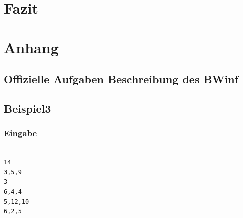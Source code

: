 \documentclass[a4paper,12pt,arial]{scrartcl}
\begin{document}
\section{Fazit}
\section{Anhang}
\subsection{Offizielle Aufgaben Beschreibung des BWinf}
\label{sec:aufgabenstellung}




\subsection{Beispiel3}
\subsubsection{Eingabe}
\texttt{ \\
14 \\
3,5,9 \\
3 \\
6,4,4 \\
5,12,10 \\
6,2,5 \\
}
\end{document}
